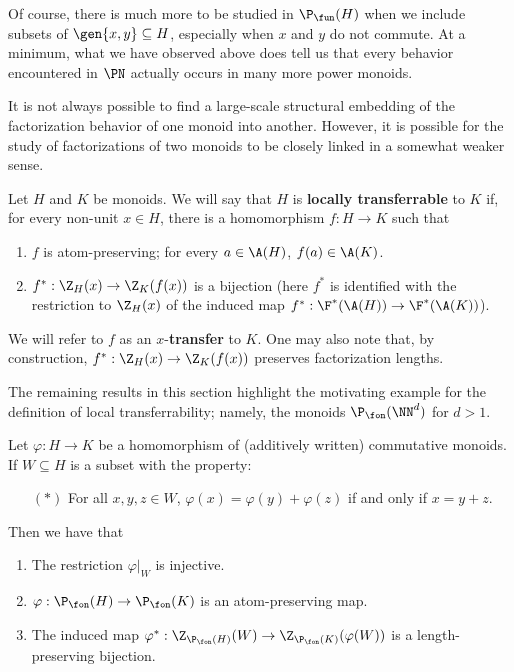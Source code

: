 Of course, there is much more to be studied in $\P_\fun(H)$ when we include subsets of $\gen{x,y}\subseteq H$, especially when $x$ and $y$ do not commute.
At a minimum, what we have observed above does tell us that every behavior encountered in $\PN$ actually occurs in many more power monoids.

It is not always possible to find a large-scale structural embedding of the factorization behavior of one monoid into another.  
However, it is possible for the study of factorizations of two monoids to be closely linked in a somewhat weaker sense.

\begin{defn} \label{def:local transfer}
Let $H$ and $K$ be monoids. 
We will say that $H$ is \textbf{locally transferrable} to $K$ if, for every non-unit $x\in H$, there is a homomorphism $f: H \to K$ such that 
\begin{enumerate}[label={\rm (\roman{*})}]
	\item $f$ is atom-preserving; for every $a\in \A(H)$, $f(a)\in \A(K)$.
	\item $f^*:\Z_H(x) \to \Z_K(f(x))$ is a bijection (here $f^*$ is identified with the restriction to $\Z_H(x)$ of the induced map $f^*: \F^*(\A(H)) \to \F^*(\A(K))$).
\end{enumerate}
We will refer to $f$ as an $x$-\textbf{transfer} to $K$.
One may also note that, by construction, $f^*:\Z_H(x) \to \Z_K(f(x))$ preserves factorization lengths.
\end{defn}

The remaining results in this section highlight the motivating example for the definition of local transferrability; namely, the monoids $\P_\fon(\NN^d)$ for $d>1$.

\begin{lemma}\label{lem:local-transport}
Let $\varphi: H \to K$ be a homomorphism of (additively written) commutative monoids. 
If $W\subseteq H$ is a subset with the property:
\begin{itemize}
\item[$(*)$] For all $x,y,z\in W$, $\varphi(x) = \varphi(y) + \varphi(z)$ if and only if $x = y + z$.
\end{itemize}
Then we have that
\begin{enumerate}[label={\rm (\roman{*})}]
\item The restriction $\varphi|_W$ is injective.
\item $\varphi:\P_\fon(H) \to \P_\fon(K)$ is an atom-preserving map.
\item The induced map $\varphi^*:\Z_{\P_\fon(H)}(W) \to \Z_{\P_\fon(K)}(\varphi(W))$ is a length-preserving bijection.
\end{enumerate}
\end{lemma}

